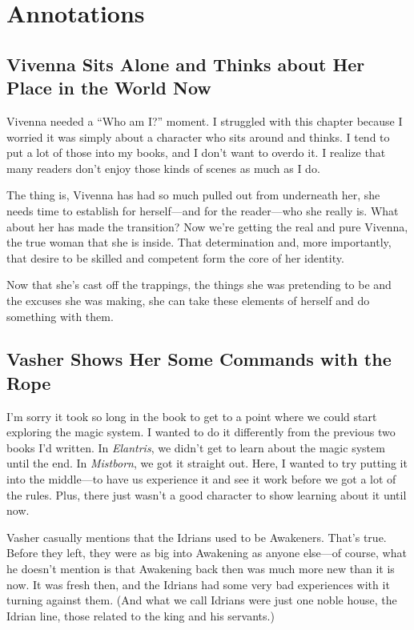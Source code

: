 \section*{Annotations}

\subsection*{Vivenna Sits Alone and Thinks about Her Place in the World Now}

Vivenna needed a “Who am I?” moment. I struggled with this chapter because I worried it was simply about a character who sits around and thinks. I tend to put a lot of those into my books, and I don’t want to overdo it. I realize that many readers don’t enjoy those kinds of scenes as much as I do.

The thing is, Vivenna has had so much pulled out from underneath her, she needs time to establish for herself—and for the reader—who she really is. What about her has made the transition? Now we’re getting the real and pure Vivenna, the true woman that she is inside. That determination and, more importantly, that desire to be skilled and competent form the core of her identity.

Now that she’s cast off the trappings, the things she was pretending to be and the excuses she was making, she can take these elements of herself and do something with them.

\subsection*{Vasher Shows Her Some Commands with the Rope}

I’m sorry it took so long in the book to get to a point where we could start exploring the magic system. I wanted to do it differently from the previous two books I’d written. In \textit{Elantris}, we didn’t get to learn about the magic system until the end. In \textit{Mistborn}, we got it straight out. Here, I wanted to try putting it into the middle—to have us experience it and see it work before we got a lot of the rules. Plus, there just wasn’t a good character to show learning about it until now.

Vasher casually mentions that the Idrians used to be Awakeners. That’s true. Before they left, they were as big into Awakening as anyone else—of course, what he doesn’t mention is that Awakening back then was much more new than it is now. It was fresh then, and the Idrians had some very bad experiences with it turning against them. (And what we call Idrians were just one noble house, the Idrian line, those related to the king and his servants.)

